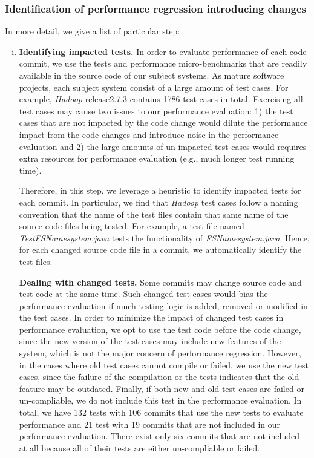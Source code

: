 \subsubsection{Identification of  performance regression introducing changes}
In more detail, we give a list of particular step:
\begin{enumerate}[(i)]
\item \textbf{Identifying impacted tests.} In order to evaluate performance of each code commit, we use the tests and performance micro-benchmarks that are readily available in the source code of our subject systems. As mature software projects, each subject system consist of a large amount of test cases. 
For example, \emph{Hadoop} release2.7.3 contains 1786 test cases in total. Exercising all test cases may cause two issues to our performance evaluation: 1) the test cases that are not impacted by the code change would dilute the performance impact from the code changes and introduce noise in the performance evaluation and 2) the large amounts of un-impacted test cases would requires extra resources for performance evaluation (e.g., much longer test running time). 

Therefore, in this step, we leverage a heuristic to identify impacted tests for each commit. In particular, we find that \emph{Hadoop} test cases follow a naming convention that the name of the test files contain that same name of the source code files being tested. For example, a test file named \emph{TestFSNamesystem.java} tests the functionality of \emph{FSNamesystem.java}. Hence, for each changed source code file in a commit, we automatically identify the test files. 

\noindent \textbf{Dealing with changed tests.} Some commits may change source code and test code at the same time. Such changed test cases would bias the performance evaluation if much testing logic is added, removed or modified in the test cases. In order to minimize the impact of changed test cases in performance evaluation, we opt to use the test code before the code change, since the new version of the test cases may include new features of the system, which is not the major concern of performance regression. However, in the cases where old test cases cannot compile or failed, we use the new test cases, since the failure of the compilation or the tests indicates that the old feature may be outdated. Finally, if both new and old test cases are failed or un-compliable, we do not include this test in the performance evaluation. In total, we have 132 tests with 106 commits that use the new tests to evaluate performance and 21 test with 19 commits that are not included in our performance evaluation. There exist only six commits that are not included at all because all of their tests are either un-compliable or failed.


\end{enumerate}
